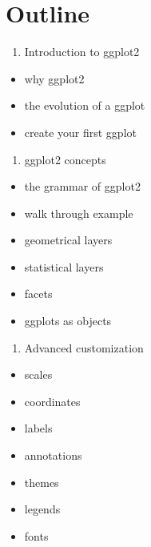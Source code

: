 \documentclass[
]{book}
\providecommand{\tightlist}{%
  \setlength{\itemsep}{0pt}\setlength{\parskip}{0pt}}
\begin{document}
\hypertarget{outline}{%
\section*{Outline}\label{outline}}

\begin{enumerate}
\def\labelenumi{\arabic{enumi}.}
\tightlist
\item
  Introduction to ggplot2
\end{enumerate}

\begin{itemize}
\tightlist
\item
  why ggplot2
\item
  the evolution of a ggplot
\item
  create your first ggplot
\end{itemize}

\begin{enumerate}
\def\labelenumi{\arabic{enumi}.}
\setcounter{enumi}{1}
\tightlist
\item
  ggplot2 concepts
\end{enumerate}

\begin{itemize}
\tightlist
\item
  the grammar of ggplot2
\item
  walk through example
\item
  geometrical layers
\item
  statistical layers
\item
  facets
\item
  ggplots as objects
\end{itemize}

\begin{enumerate}
\def\labelenumi{\arabic{enumi}.}
\setcounter{enumi}{2}
\tightlist
\item
  Advanced customization
\end{enumerate}

\begin{itemize}
\tightlist
\item
  scales
\item
  coordinates
\item
  labels
\item
  annotations
\item
  themes
\item
  legends
\item
  fonts
\end{itemize}
\end{document}
